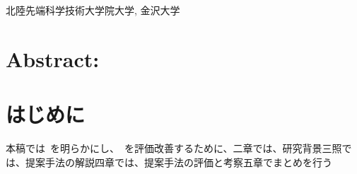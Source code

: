 \vspace*{4mm}	%

\dag 北陸先端科学技術大学院大学, \ddagger 金沢大学%

\vspace*{6mm}	%


\noindent\section*{Abstract:}\section{はじめに}本稿では~を明らかにし、~を評価改善するために、二章では、研究背景三照では、提案手法の解説四章では、提案手法の評価と考察五章でまとめを行う

